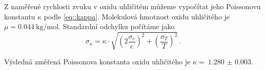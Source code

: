 Z naměřené rychlosti zvuku v oxidu uhličitém můžeme vypočítat jeho Poissonovu konstantu $\kappa$ podle \eqref{eq::kappa}.
Molekulová hmotnost oxidu uhličitého je $\mu=\SI{0.044}{\kg\per\mole}$.
Standardní odchylku počítáme jako
\begin{equation}
\sigma_\kappa = \kappa \cdot \sqrt{ \left(2\frac{\sigma_c}{c}\right)^2    +    \left( \frac{\sigma_T}{T} \right)^2} \,.
\end{equation}

Výsledná změřená Poissonova konstanta oxidu uhličitého je $\kappa =~\num{1.280(3)}$.